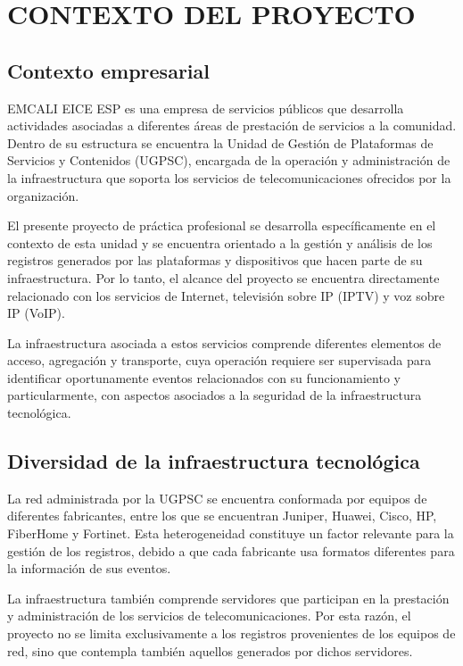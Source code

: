 \chapter{CONTEXTO DEL PROYECTO}

\section{Contexto empresarial}
EMCALI EICE ESP es una empresa de servicios públicos que desarrolla actividades asociadas a diferentes áreas de prestación de servicios a la comunidad. Dentro de su estructura se encuentra la Unidad de Gestión de Plataformas de Servicios y Contenidos (UGPSC), encargada de la operación y administración de la infraestructura que soporta los servicios de telecomunicaciones ofrecidos por la organización.

El presente proyecto de práctica profesional se desarrolla específicamente en el contexto de esta unidad y se encuentra orientado a la gestión y análisis de los registros generados por las plataformas y dispositivos que hacen parte de su infraestructura. Por lo tanto, el alcance del proyecto se encuentra directamente relacionado con los servicios de Internet, televisión sobre IP (IPTV) y voz sobre IP (VoIP).

La infraestructura asociada a estos servicios comprende diferentes elementos de acceso, agregación y transporte, cuya operación requiere ser supervisada para identificar oportunamente eventos relacionados con su funcionamiento y particularmente, con aspectos asociados a la seguridad de la infraestructura tecnológica.

\section{Diversidad de la infraestructura tecnológica}
La red administrada por la UGPSC se encuentra conformada por equipos de diferentes fabricantes, entre los que se encuentran Juniper, Huawei, Cisco, HP, FiberHome y Fortinet. Esta heterogeneidad constituye un factor relevante para la gestión de los registros, debido a que cada fabricante usa formatos diferentes para la información de sus eventos.

La infraestructura también comprende servidores que participan en la prestación y administración de los servicios de telecomunicaciones. Por esta razón, el proyecto no se limita exclusivamente a los registros provenientes de los equipos de red, sino que contempla también aquellos generados por dichos servidores.

